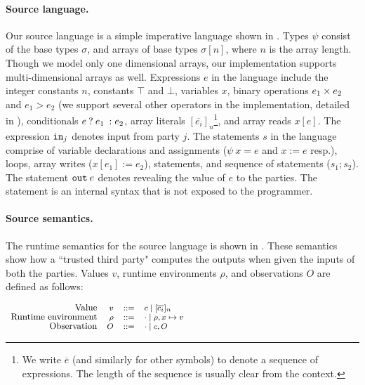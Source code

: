 \paragraph{Source language.} Our source language
 is a simple imperative language shown in . Types
$\psi$ consist of the base types $\sigma$, and arrays
of base types $\sigma[n]$, where $n$ is the array length. Though we
model only one dimensional arrays, our implementation supports
 multi-dimensional arrays as well. Expressions $e$ in the language include the
 integer constants $n$,  constants $\top$ and $\bot$,
variables $x$, binary operations $e_{1} \times e_{2}$ and $e_{1} >
e_{2}$ (we support several other
operators in the implementation, detailed in ),
conditionals ${{e}\:?\:{e_{1}}\::{e_{2}}}$,
array literals
$[\overline{e_{i}}]_{n}$\footnote{We write $\overline{e}$ (and
  similarly for other symbols) to denote a sequence of expressions.
The length of the sequence is usually clear from the context.}, and
array reads $x[e]$. The expression ${\mathtt{in}}_{j}$ denotes input from
party $j$. The statements $s$ in the language comprise of variable
declarations and assignments ($\psi\:x = e$ and $x := e$ resp.),
 loops, array writes ($x[e_{1}] := e_{2}$), 
statements, and sequence of statements ($s_{1}; s_{2}$). The statement
${\mathtt{out}}\:e$ denotes revealing the value of $e$ to the
parties. The  statement is an internal syntax that is not
exposed to the programmer. \\

\paragraph{Source semantics.} The runtime semantics for the source language is shown in
. These semantics show how a ``trusted third party" computes the outputs when given the inputs of both the parties. 
 Values $v$, runtime environments $\rho$, and
observations $O$ are defined as follows:

\vspace{0.1cm}
$
\footnotesize
\begin{array}{rrcl}
    \text{\small{Value}} & v &::=& c \mid [\overline{c_{i}}]_{n}\\
    \text{\small{Runtime environment}} & \rho &::=& \cdot \mid \rho,x \mapsto v\\
    \text{\small{Observation}} & O & ::= & \cdot \mid c, O \\
\end{array}
$

